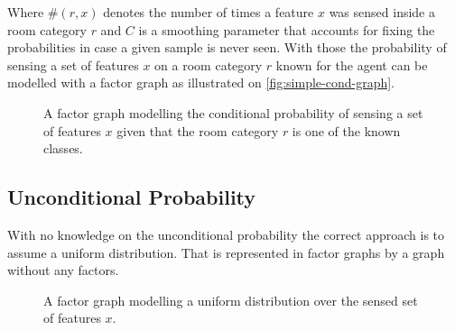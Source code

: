 Where $\#(r,x)$ denotes the number of times a feature $x$ was sensed inside a
room category $r$ and $C$ is a smoothing parameter that accounts for fixing
the probabilities in case a given sample is never seen.
With those the probability of sensing a set of features $x$ on a room category
$r$ known for the agent can be modelled with a factor graph as illustrated on
\autoref{fig:simple-cond-graph}.

\begin{figure}[h]
\centering
{}
\caption{\label{fig:simple-cond-graph}A factor graph modelling the conditional
probability of sensing a set of features $x$ given that the room category $r$ is
one of the known classes.}
\end{figure}

\subsection{Unconditional Probability}
\label{sec:sample-uncond-prob}
With no knowledge on the unconditional probability the correct approach is to
assume a uniform distribution.
That is represented in factor graphs by a graph without any factors.

\begin{figure}[h]
\centering
{}
\caption{\label{fig:simple-uniform-graph}A factor graph modelling a uniform
         distribution over the sensed set of features $x$.}
\end{figure}

